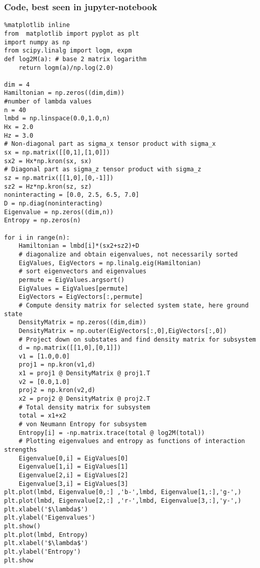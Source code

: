 \documentclass{beamer}
\begin{document}
\begin{frame}
\frametitle{Code, best seen in jupyter-notebook}

\begin{verbatim}
%matplotlib inline
from  matplotlib import pyplot as plt
import numpy as np
from scipy.linalg import logm, expm
def log2M(a): # base 2 matrix logarithm
    return logm(a)/np.log(2.0)

dim = 4
Hamiltonian = np.zeros((dim,dim))
#number of lambda values
n = 40
lmbd = np.linspace(0.0,1.0,n)
Hx = 2.0
Hz = 3.0
# Non-diagonal part as sigma_x tensor product with sigma_x
sx = np.matrix([[0,1],[1,0]])
sx2 = Hx*np.kron(sx, sx)
# Diagonal part as sigma_z tensor product with sigma_z
sz = np.matrix([[1,0],[0,-1]])
sz2 = Hz*np.kron(sz, sz)
noninteracting = [0.0, 2.5, 6.5, 7.0]
D = np.diag(noninteracting)
Eigenvalue = np.zeros((dim,n))
Entropy = np.zeros(n)

for i in range(n): 
    Hamiltonian = lmbd[i]*(sx2+sz2)+D
    # diagonalize and obtain eigenvalues, not necessarily sorted
    EigValues, EigVectors = np.linalg.eig(Hamiltonian)
    # sort eigenvectors and eigenvalues
    permute = EigValues.argsort()
    EigValues = EigValues[permute]
    EigVectors = EigVectors[:,permute]
    # Compute density matrix for selected system state, here ground state
    DensityMatrix = np.zeros((dim,dim))
    DensityMatrix = np.outer(EigVectors[:,0],EigVectors[:,0])
    # Project down on substates and find density matrix for subsystem
    d = np.matrix([[1,0],[0,1]])
    v1 = [1.0,0.0]
    proj1 = np.kron(v1,d)
    x1 = proj1 @ DensityMatrix @ proj1.T
    v2 = [0.0,1.0]
    proj2 = np.kron(v2,d)
    x2 = proj2 @ DensityMatrix @ proj2.T
    # Total density matrix for subsystem
    total = x1+x2
    # von Neumann Entropy for subsystem 
    Entropy[i] = -np.matrix.trace(total @ log2M(total))
    # Plotting eigenvalues and entropy as functions of interaction strengths
    Eigenvalue[0,i] = EigValues[0]
    Eigenvalue[1,i] = EigValues[1]
    Eigenvalue[2,i] = EigValues[2]
    Eigenvalue[3,i] = EigValues[3]
plt.plot(lmbd, Eigenvalue[0,:] ,'b-',lmbd, Eigenvalue[1,:],'g-',)
plt.plot(lmbd, Eigenvalue[2,:] ,'r-',lmbd, Eigenvalue[3,:],'y-',)
plt.xlabel('$\lambda$')
plt.ylabel('Eigenvalues')
plt.show()
plt.plot(lmbd, Entropy)
plt.xlabel('$\lambda$')
plt.ylabel('Entropy')          
plt.show

\end{verbatim}
\end{frame}
\end{document}
